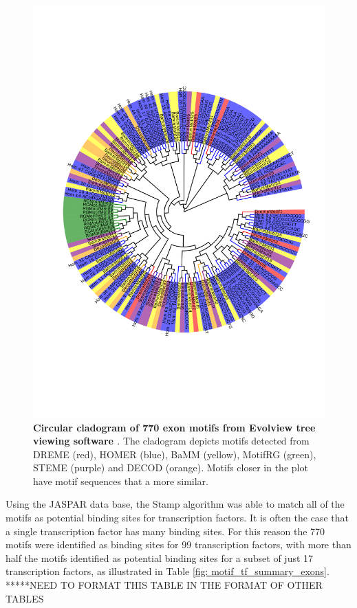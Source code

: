 \documentclass[12pt]{article}
\begin{document}
\begin{figure}[htbp] 
     \includegraphics[width= \textwidth]{exon_pilot_cardiogram.pdf} 
    \caption{{\bf Circular cladogram of 770 exon motifs from Evolview tree viewing software \citep{He2016} }. 
    The cladogram depicts motifs detected from DREME (red), HOMER (blue), BaMM (yellow), MotifRG (green), STEME (purple)
    and DECOD (orange). Motifs closer in the plot have motif sequences that a more similar.}
    \label{fig: exon_cladogram}
\end{figure}

Using the JASPAR data base, the Stamp algorithm was able to match all of the motifs as potential binding sites for transcription factors. It is often the case that a single transcription factor has many binding sites. For this reason the 770 motifs were identified as binding sites for 99 transcription factors, with more than half the motifs identified as potential binding sites for a subset of just 17 transcription factors, as illustrated in Table \ref{fig: motif_tf_summary_exons}. *****NEED TO FORMAT THIS TABLE IN THE FORMAT OF OTHER TABLES
\end{document}
